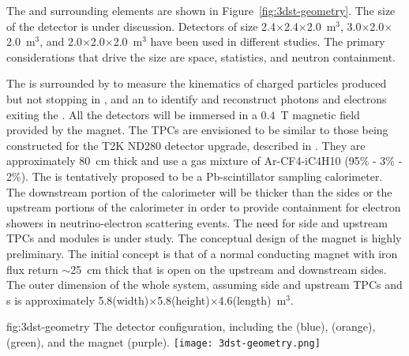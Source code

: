 The  and surrounding elements are shown in Figure~\ref{fig:3dst-geometry}.  The size of the  detector is under discussion.  Detectors of size 2.4$\times$2.4$\times$2.0~m$^{3}$, 3.0$\times$2.0$\times$2.0~m$^{3}$, and 2.0$\times$2.0$\times$2.0~m$^{3}$ have been used in different studies.  The primary considerations that drive the size are space, statistics, and neutron containment.

The  is surrounded by  to measure the kinematics of charged particles produced but not stopping in , and an  to identify and reconstruct photons and electrons exiting the . All the detectors will be immersed in a 0.4~T magnetic field provided by the magnet. The TPCs are envisioned to be similar to those being constructed for the T2K ND280 detector upgrade, described in \cite{Abe:2019whr}.  They are approximately 80~cm thick and use a gas mixture of Ar-CF4-iC4H10 (95\% - 3\% - 2\%).  The  is tentatively proposed to be a Pb-scintillator sampling calorimeter.  The downstream portion of the calorimeter will be thicker than the sides or the upstream portions of the calorimeter in order to provide containment for electron showers in neutrino-electron scattering events.  The need for side and upstream TPCs and  modules is under study.  The conceptual design of the magnet is highly preliminary.  The initial concept is that of a normal conducting magnet with iron flux return $\sim$25~cm thick that is open on the upstream and downstream sides.
The outer dimension of the whole system, assuming side and upstream TPCs and s is approximately 5.8(width)$\times$5.8(height)$\times$4.6(length)~m$^3$. 



\begin{dunefigure}{fig:3dst-geometry}
{The  detector configuration, including the  (blue),  (orange),  (green), and the magnet (purple).}
  \texttt{[image: 3dst-geometry.png]}
\end{dunefigure}



